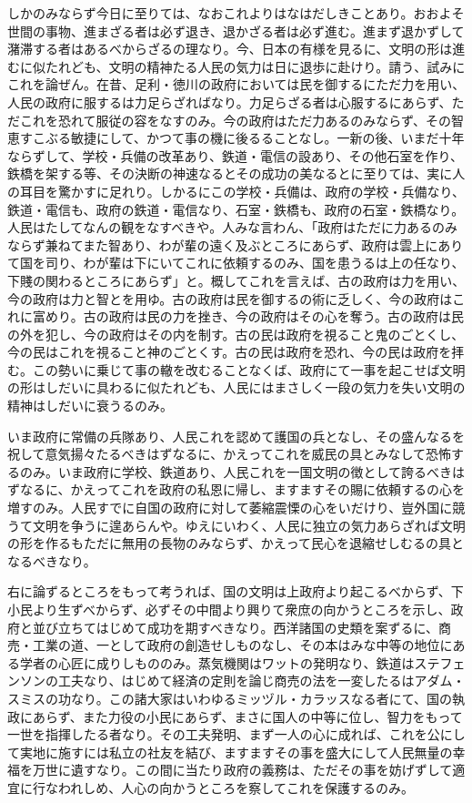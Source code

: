 \documentclass[a4paper, platex, dvipdfmx]{jsarticle}
\begin{document}
しかのみならず今日に至りては、なおこれよりはなはだしきことあり。おおよそ世間の事物、進まざる者は必ず退き、退かざる者は必ず進む。進まず退かずして潴滞する者はあるべからざるの理なり。今、日本の有様を見るに、文明の形は進むに似たれども、文明の精神たる人民の気力は日に退歩に赴けり。請う、試みにこれを論ぜん。在昔、足利・徳川の政府においては民を御するにただ力を用い、人民の政府に服するは力足らざればなり。力足らざる者は心服するにあらず、ただこれを恐れて服従の容をなすのみ。今の政府はただ力あるのみならず、その智恵すこぶる敏捷にして、かつて事の機に後るることなし。一新の後、いまだ十年ならずして、学校・兵備の改革あり、鉄道・電信の設あり、その他石室を作り、鉄橋を架する等、その決断の神速なるとその成功の美なるとに至りては、実に人の耳目を驚かすに足れり。しかるにこの学校・兵備は、政府の学校・兵備なり、鉄道・電信も、政府の鉄道・電信なり、石室・鉄橋も、政府の石室・鉄橋なり。人民はたしてなんの観をなすべきや。人みな言わん、「政府はただに力あるのみならず兼ねてまた智あり、わが輩の遠く及ぶところにあらず、政府は雲上にありて国を司り、わが輩は下にいてこれに依頼するのみ、国を患うるは上の任なり、下賤の関わるところにあらず」と。概してこれを言えば、古の政府は力を用い、今の政府は力と智とを用ゆ。古の政府は民を御するの術に乏しく、今の政府はこれに富めり。古の政府は民の力を挫き、今の政府はその心を奪う。古の政府は民の外を犯し、今の政府はその内を制す。古の民は政府を視ること鬼のごとくし、今の民はこれを視ること神のごとくす。古の民は政府を恐れ、今の民は政府を拝む。この勢いに乗じて事の轍を改むることなくば、政府にて一事を起こせば文明の形はしだいに具わるに似たれども、人民にはまさしく一段の気力を失い文明の精神はしだいに衰うるのみ。

いま政府に常備の兵隊あり、人民これを認めて護国の兵となし、その盛んなるを祝して意気揚々たるべきはずなるに、かえってこれを威民の具とみなして恐怖するのみ。いま政府に学校、鉄道あり、人民これを一国文明の徴として誇るべきはずなるに、かえってこれを政府の私恩に帰し、ますますその賜に依頼するの心を増すのみ。人民すでに自国の政府に対して萎縮震慄の心をいだけり、豈外国に競うて文明を争うに遑あらんや。ゆえにいわく、人民に独立の気力あらざれば文明の形を作るもただに無用の長物のみならず、かえって民心を退縮せしむるの具となるべきなり。

右に論ずるところをもって考うれば、国の文明は上政府より起こるべからず、下小民より生ずべからず、必ずその中間より興りて衆庶の向かうところを示し、政府と並び立ちてはじめて成功を期すべきなり。西洋諸国の史類を案ずるに、商売・工業の道、一として政府の創造せしものなし、その本はみな中等の地位にある学者の心匠に成りしもののみ。蒸気機関はワットの発明なり、鉄道はステフェンソンの工夫なり、はじめて経済の定則を論じ商売の法を一変したるはアダム・スミスの功なり。この諸大家はいわゆるミッヅル・カラッスなる者にて、国の執政にあらず、また力役の小民にあらず、まさに国人の中等に位し、智力をもって一世を指揮したる者なり。その工夫発明、まず一人の心に成れば、これを公にして実地に施すには私立の社友を結び、ますますその事を盛大にして人民無量の幸福を万世に遺すなり。この間に当たり政府の義務は、ただその事を妨げずして適宜に行なわれしめ、人心の向かうところを察してこれを保護するのみ。
\end{document}

